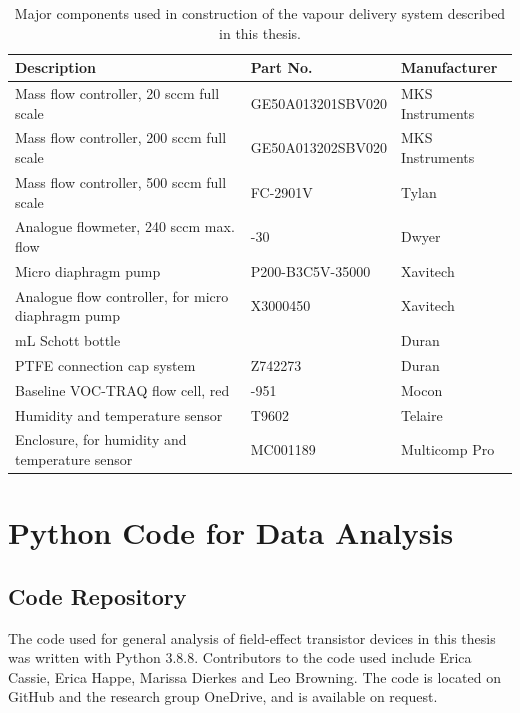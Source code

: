 \documentclass[
  a4paper,
]{scrbook}
\begin{document}
\hypertarget{tbl-vapour-sensor-components}{}
\begin{longtable}[t]{>{\raggedright\arraybackslash}p{5.5cm}>{\raggedright\arraybackslash}p{4.5cm}>{\raggedright\arraybackslash}p{3.75cm}}
\caption{\label{tbl-vapour-sensor-components}Major components used in construction of the vapour delivery system
described in this thesis. }\tabularnewline

\toprule
Description & Part No. & Manufacturer\\
\midrule
Mass flow controller, 20 sccm full scale & GE50A013201SBV020 & MKS Instruments\\
Mass flow controller, 200 sccm full scale & GE50A013202SBV020 & MKS Instruments\\
Mass flow controller, 500 sccm full scale & FC-2901V & Tylan\\
Analogue flowmeter, 240 sccm max. flow & 116261-30 & Dwyer\\
Micro diaphragm pump & P200-B3C5V-35000 & Xavitech\\
\addlinespace
Analogue flow controller, for micro diaphragm pump & X3000450 & Xavitech\\
10 mL Schott bottle & 218010802 & Duran\\
PTFE connection cap system & Z742273 & Duran\\
Baseline VOC-TRAQ flow cell, red & 043-951 & Mocon\\
Humidity and temperature sensor & T9602 & Telaire\\
\addlinespace
Enclosure, for humidity and temperature sensor & MC001189 & Multicomp Pro\\
\bottomrule
\end{longtable}

\hypertarget{sec-python}{%
\chapter{Python Code for Data Analysis}\label{sec-python}}

\hypertarget{code-repository}{%
\section{Code Repository}\label{code-repository}}

The code used for general analysis of field-effect transistor devices in
this thesis was written with Python 3.8.8. Contributors to the code used
include Erica Cassie, Erica Happe, Marissa Dierkes and Leo Browning. The
code is located on GitHub and the research group OneDrive, and is
available on request.
\end{document}
